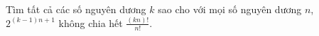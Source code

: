 \ifshowproblem
\begin{problem}\label{example:CHN-2015-NML-P4}
    Tìm tất cả các số nguyên dương $k$ sao cho với mọi số nguyên dương $n$, $2^{(k-1)n+1}$ không chia hết $\frac{(kn)!}{n!}$.
\end{problem}
\fi

\footnotemark
{}
\fi